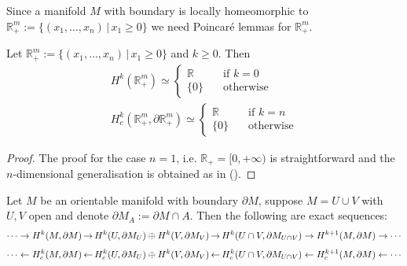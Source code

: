 Since a manifold $M$ with boundary is locally homeomorphic to $\mathbb{R}^m_+:=\{(x_1,\dots,x_n)\,|\, x_1\geq 0\}$ we need Poincar\'e lemmas for $\mathbb{R}^m_+$.


\begin{lemm}
	Let $\mathbb{R}^m_+:=\{(x_1,\dots,x_n)\,|\, x_1\geq 0\}$ and $k\geq 0$. Then
	\begin{align}
	H^k(\mathbb{R}^m_+)\simeq\begin{cases}
	\mathbb{R}\quad &\text{if }k=0\\
	\{0\}\quad &\text{otherwise}
	\end{cases}\\
	H^k_c(\mathbb{R}^m_+,\partial\mathbb{R}^m_+)\simeq\begin{cases}
	\mathbb{R}\quad &\text{if }k=n\\
	\{0\}\quad &\text{otherwise}
	\end{cases}
	\end{align}
\end{lemm}

\begin{proof}
	The proof for the case $n=1$, i.e. $\mathbb{R}_+=[0,+\infty)$ is straightforward and the $n$-dimensional generalisation is obtained as in (\cite[Sec. 4]{Bott-Tu-82}).
\end{proof}

\begin{lemm}
	Let $M$ be an orientable manifold with boundary $\partial M$, suppose $M=U\cup V$ with $U,V$ open and denote $\partial M_A:=\partial M\cap A$. Then the following are exact sequences:
	\begin{align}
	\cdots\to H^k(M,\partial M)\operatornamewithlimits{\rightarrow} H^k(U,\partial M_{U})\oplus H^k(V,\partial M_{V})  \operatornamewithlimits{\rightarrow} H^k(U\cap V,\partial M_{U\cap V})\rightarrow H^{k+1}(M,\partial M)\to\cdots
	\end{align}
	\vspace{-0.6cm}
	\begin{align}
	\cdots\leftarrow H_c^k(M,\partial M)\operatornamewithlimits{\leftarrow} H_c^k(U,\partial M_{U})\oplus H^k(V,\partial M_{V})  \operatornamewithlimits{\leftarrow} H_c^k(U\cap V,\partial M_{U\cap V})\leftarrow H_c^{k+1}(M,\partial M)\leftarrow\cdots
	\end{align}
\end{lemm}

